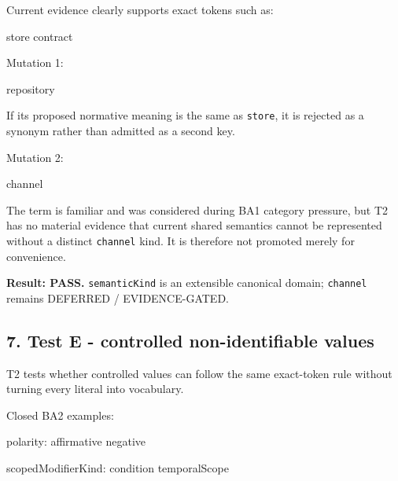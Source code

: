 \documentclass[
  10pt,
  a4paper,
]{article}
\newenvironment{Shaded}{}{}
\newcommand{\NormalTok}[1]{#1}
\begin{document}
Current evidence clearly supports exact tokens such as:

\begin{Shaded}
\begin{Highlighting}[]
\NormalTok{store}
\NormalTok{contract}
\end{Highlighting}
\end{Shaded}

Mutation 1:

\begin{Shaded}
\begin{Highlighting}[]
\NormalTok{repository}
\end{Highlighting}
\end{Shaded}

If its proposed normative meaning is the same as \texttt{store}, it is
rejected as a synonym rather than admitted as a second key.

Mutation 2:

\begin{Shaded}
\begin{Highlighting}[]
\NormalTok{channel}
\end{Highlighting}
\end{Shaded}

The term is familiar and was considered during BA1 category pressure,
but T2 has no material evidence that current shared semantics cannot be
represented without a distinct \texttt{channel} kind. It is therefore
not promoted merely for convenience.

\textbf{Result: PASS.} \texttt{semanticKind} is an extensible canonical
domain; \texttt{channel} remains DEFERRED / EVIDENCE-GATED.

\subsection{7. Test E - controlled non-identifiable
values}\label{test-e---controlled-non-identifiable-values}

T2 tests whether controlled values can follow the same exact-token rule
without turning every literal into vocabulary.

Closed BA2 examples:

\begin{Shaded}
\begin{Highlighting}[]
\NormalTok{polarity:}
\NormalTok{  affirmative}
\NormalTok{  negative}

\NormalTok{scopedModifierKind:}
\NormalTok{  condition}
\NormalTok{  temporalScope}
\end{Highlighting}
\end{Shaded}
\end{document}
